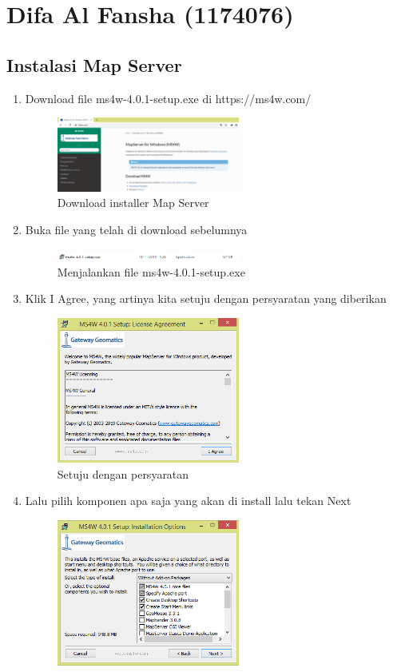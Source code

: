 \section{Difa Al Fansha (1174076)}
\subsection{Instalasi Map Server}
\begin{enumerate}
	\item Download file ms4w-4.0.1-setup.exe di https://ms4w.com/
		\begin{figure}[H]
			\includegraphics[width=6cm]{figures/Tugas4/1174076/1.png}
			\centering
			\caption{Download installer Map Server}
		\end{figure}
	\item Buka file yang telah di download sebelumnya
		\begin{figure}[H]
			\includegraphics[width=6cm]{figures/Tugas4/1174076/2.png}
			\centering
			\caption{Menjalankan file ms4w-4.0.1-setup.exe}
		\end{figure}
	\item Klik I Agree, yang artinya kita setuju dengan persyaratan yang diberikan
		\begin{figure}[H]
			\includegraphics[width=6cm]{figures/Tugas4/1174076/3.png}
			\centering
			\caption{Setuju dengan persyaratan}
		\end{figure}
	\item Lalu pilih komponen apa saja yang akan di install lalu tekan Next
		\begin{figure}[H]
			\includegraphics[width=6cm]{figures/Tugas4/1174076/4.png}

\end{figure}
\end{enumerate}
